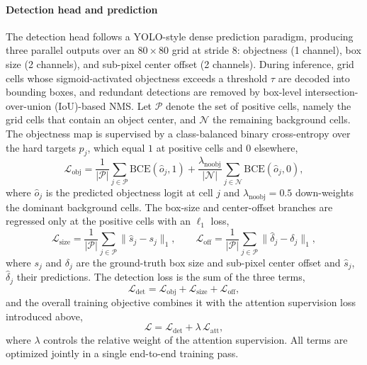 \documentclass[lettersize,journal]{IEEEtran}
\begin{document}
\paragraph{Detection head and prediction}
The detection head follows a YOLO-style dense prediction paradigm, producing
three parallel outputs over an $80\times80$ grid at stride 8: objectness (1
channel), box size (2 channels), and sub-pixel center offset (2 channels).
During inference, grid cells whose sigmoid-activated objectness exceeds a
threshold $\tau$ are decoded into bounding boxes, and redundant detections are
removed by box-level intersection-over-union (IoU)-based NMS. Let $\mathcal{P}$
denote the set of positive cells, namely the grid cells that contain an object
center, and $\mathcal{N}$ the remaining background cells. The objectness map is
supervised by a class-balanced binary cross-entropy over the hard targets $p_j$,
which equal $1$ at positive cells and $0$ elsewhere,
\begin{equation}
\mathcal{L}_{\mathrm{obj}} = \frac{1}{|\mathcal{P}|}\sum_{j\in\mathcal{P}} \mathrm{BCE}(\hat{o}_j, 1)
+ \frac{\lambda_{\mathrm{noobj}}}{|\mathcal{N}|}\sum_{j\in\mathcal{N}} \mathrm{BCE}(\hat{o}_j, 0),
\end{equation}
where $\hat{o}_j$ is the predicted objectness logit at cell $j$ and
$\lambda_{\mathrm{noobj}}=0.5$ down-weights the dominant background cells. The
box-size and center-offset branches are regressed only at the positive cells
with an $\ell_1$ loss,
\begin{equation}
\mathcal{L}_{\mathrm{size}} = \frac{1}{|\mathcal{P}|}\sum_{j\in\mathcal{P}} \lVert \hat{s}_j - s_j \rVert_1,
\qquad
\mathcal{L}_{\mathrm{off}} = \frac{1}{|\mathcal{P}|}\sum_{j\in\mathcal{P}} \lVert \hat{\delta}_j - \delta_j \rVert_1,
\end{equation}
where $s_j$ and $\delta_j$ are the ground-truth box size and sub-pixel center
offset and $\hat{s}_j$, $\hat{\delta}_j$ their predictions. The detection loss
is the sum of the three terms,
\begin{equation}
\mathcal{L}_{\mathrm{det}} = \mathcal{L}_{\mathrm{obj}} + \mathcal{L}_{\mathrm{size}} + \mathcal{L}_{\mathrm{off}},
\end{equation}
and the overall training objective combines it with the attention supervision
loss introduced above,
\begin{equation}
\mathcal{L} = \mathcal{L}_{\mathrm{det}} + \lambda\, \mathcal{L}_{\mathrm{att}},
\end{equation}
where $\lambda$ controls the relative weight of the attention supervision. All
terms are optimized jointly in a single end-to-end training pass.
\end{document}
